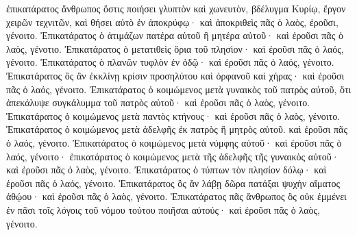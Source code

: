 {ἐπικατάρατος ἄνθρωπος ὅστις ποιήσει γλυπτὸν καὶ χωνευτὸν, βδέλυγμα Κυρίῳ, ἔργον χειρῶν τεχνιτῶν, καὶ θήσει αὐτὸ ἐν ἀποκρύφῳ· καὶ ἀποκριθεὶς πᾶς ὁ λαὸς, ἐροῦσι, γένοιτο.
Ἐπικατάρατος ὁ ἀτιμάζων πατέρα αὐτοῦ ἢ μητέρα αὐτοῦ· καὶ ἐροῦσι πᾶς ὁ λαὸς, γένοτιο.
Ἐπικατάρατος ὁ μετατιθεὶς ὅρια τοῦ πλησὶον· καὶ ἐροῦσι πᾶς ὁ λαός, γένοιτο.
Ἐπικατάρατος ὁ πλανῶν τυφλὸν ἐν ὁδῷ· καὶ ἐροῦσι πᾶς ὁ λαός, γένοιτο.
Ἐπικατάρατος ὃς ἂν ἐκκλίνῃ κρίσιν προσηλύτου καὶ ὀρφανοῦ καὶ χήρας· καὶ ἐροῦσι πᾶς ὁ λαός, γένοιτο.
Ἐπικατάρατος ὁ κοιμώμενος μετὰ γυναικὸς τοῦ πατρὸς αὐτοῦ, ὅτι ἀπεκάλυψε συγκάλυμμα τοῦ πατρὸς αὐτοῦ· καὶ ἐροῦσι πᾶς ὁ λαὸς, γένοιτο.
Ἐπικατάρατος ὁ κοιμώμενος μετὰ παντὸς κτήνους· καὶ ἐροῦσι πᾶς ὁ λαὸς, γένοιτο.
Ἐπικατάρατος ὁ κοιμώμενος μετὰ ἀδελφῆς ἐκ πατρὸς ἢ μητρὸς αὐτοῦ. καὶ ἐροῦσι πᾶς ὁ λαός, γένοιτο.
Ἐπικατάρατος ὁ κοιμώμενος μετὰ νύμφης αὐτοῦ· καὶ ἐροῦσι πᾶς ὁ λαός, γένοιτο· ἐπικατάρατος ὁ κοιμώμενος μετὰ τῆς ἀδελφῆς τῆς γυναικὸς αὐτοῦ· καὶ ἐροῦσι πᾶς ὁ λαὸς, γένοιτο.
Ἐπικατάρατος ὁ τύπτων τὸν πλησίον δόλῳ· καὶ ἐροῦσι πᾶς ὁ λαός, γένοιτο.
Ἐπικατάρατος ὃς ἂν λάβῃ δῶρα πατάξαι ψυχὴν αἵματος ἀθῴου· καὶ ἐροῦσι πᾶς ὁ λαὸς, γένοιτο.
Ἐπικατάρατος πᾶς ἄνθρωπος ὃς οὐκ ἐμμένει ἐν πᾶσι τοῖς λόγοις τοῦ νόμου τούτου ποιῆσαι αὐτούς· καὶ ἐροῦσι πᾶς ὁ λαὸς, γένοιτο.

}
